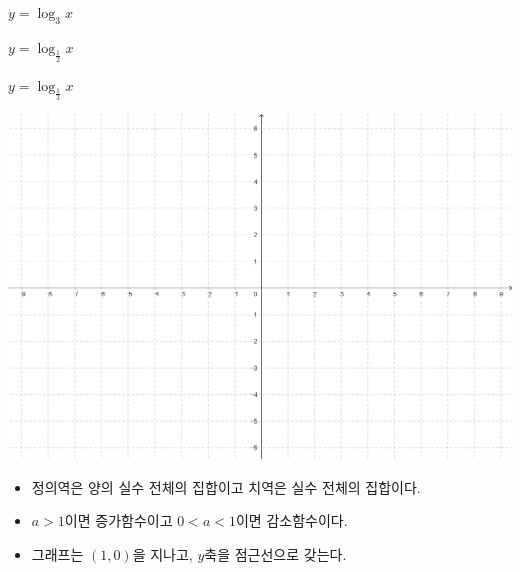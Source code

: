 \documentclass{oblivoir}
\begin{document}
%
\label{log3}
\begin{enumerate*}[itemjoin=\qquad\qquad]
\item
\(y=\log_3x\)
\item
\(y=\log_{\frac12}x\)
\item
\(y=\log_{\frac13}x\)
\end{enumerate*}
\begin{center}
\includegraphics[width=\textwidth]{96grid}
\end{center}

\newpage
\begin{mdframed}
%
\begin{itemize}\label{log4}
\item
정의역은 양의 실수 전체의 집합이고 치역은 실수 전체의 집합이다.
\item
\(a>1\)이면 증가함수이고 \(0<a<1\)이면 감소함수이다.
\item
그래프는 \((1,0)\)을 지나고, \(y\)축을 점근선으로 갖는다.
\end{itemize}
\end{mdframed}
\end{document}
